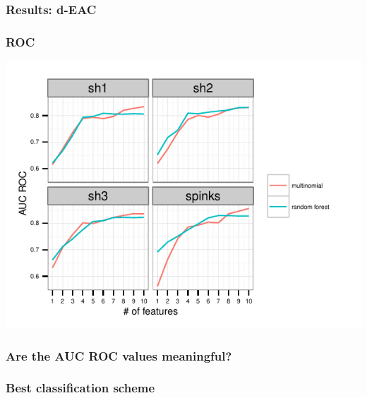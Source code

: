 \documentclass{beamer}\usepackage{graphicx, color}
\makeatletter
\def\maxwidth{ %
  \ifdim\Gin@nat@width>\linewidth
    \linewidth
  \else
    \Gin@nat@width
  \fi
}
\newenvironment{knitrout}{}{} %
\makeatother
\begin{document}
\begin{frame}
  \frametitle{Results: d-EAC}

\end{frame}

\begin{frame}[fragile]
  \frametitle{ROC}
\begin{knitrout}
\color{fgcolor}
\includegraphics[width=\maxwidth]{figure/roc} 

\end{knitrout}


\end{frame}

\begin{frame}
  \frametitle{Are the AUC ROC values meaningful?}
\end{frame}


\begin{frame}
  \frametitle{Best classification scheme}
\end{frame}
\end{document}
